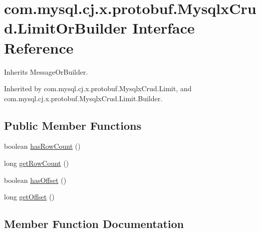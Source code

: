 \hypertarget{interfacecom_1_1mysql_1_1cj_1_1x_1_1protobuf_1_1_mysqlx_crud_1_1_limit_or_builder}{}\section{com.\+mysql.\+cj.\+x.\+protobuf.\+Mysqlx\+Crud.\+Limit\+Or\+Builder Interface Reference}
\label{interfacecom_1_1mysql_1_1cj_1_1x_1_1protobuf_1_1_mysqlx_crud_1_1_limit_or_builder}


Inherits Message\+Or\+Builder.



Inherited by com.\+mysql.\+cj.\+x.\+protobuf.\+Mysqlx\+Crud.\+Limit, and com.\+mysql.\+cj.\+x.\+protobuf.\+Mysqlx\+Crud.\+Limit.\+Builder.

\subsection*{Public Member Functions}
\begin{DoxyCompactItemize}
\item 
boolean \mbox{\hyperlink{interfacecom_1_1mysql_1_1cj_1_1x_1_1protobuf_1_1_mysqlx_crud_1_1_limit_or_builder_af9a2614f49f0fbf2cfc5fab29f73634f}{has\+Row\+Count}} ()
\item 
long \mbox{\hyperlink{interfacecom_1_1mysql_1_1cj_1_1x_1_1protobuf_1_1_mysqlx_crud_1_1_limit_or_builder_a4fb66b9084961fd4bb8b9097e02a2c45}{get\+Row\+Count}} ()
\item 
boolean \mbox{\hyperlink{interfacecom_1_1mysql_1_1cj_1_1x_1_1protobuf_1_1_mysqlx_crud_1_1_limit_or_builder_a9e42a06dd73d55663e32061eae5f716a}{has\+Offset}} ()
\item 
long \mbox{\hyperlink{interfacecom_1_1mysql_1_1cj_1_1x_1_1protobuf_1_1_mysqlx_crud_1_1_limit_or_builder_aab56605977912d30c602e2e750e49707}{get\+Offset}} ()
\end{DoxyCompactItemize}


\subsection{Member Function Documentation}
\mbox{\label{interfacecom_1_1mysql_1_1cj_1_1x_1_1protobuf_1_1_mysqlx_crud_1_1_limit_or_builder_aab56605977912d30c602e2e750e49707}} 
